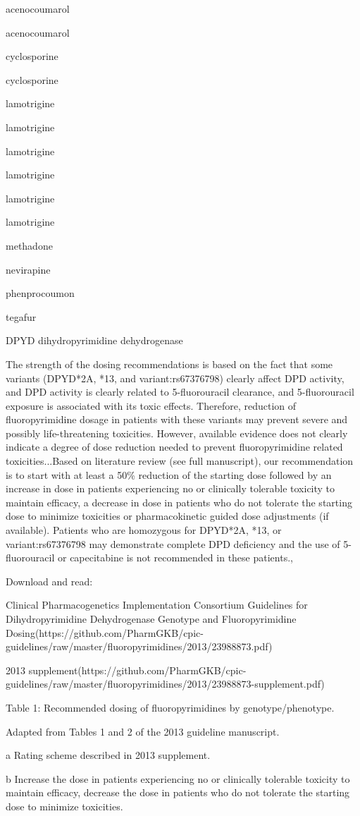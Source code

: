 \documentclass{resume} %
\begin{document}
\begin{rSection}{ acenocoumarol }
\begin{rSection}{ acenocoumarol }
\begin{rSection}{ cyclosporine }
\begin{rSection}{ cyclosporine }
\begin{rSection}{ lamotrigine }
\begin{rSection}{ lamotrigine }
\begin{rSection}{ lamotrigine }
\begin{rSection}{ lamotrigine }
\begin{rSection}{ lamotrigine }
\begin{rSection}{ lamotrigine }
\begin{rSection}{ methadone }
\begin{rSection}{ nevirapine }
\begin{rSection}{ phenprocoumon }
\begin{rSection}{ tegafur }
\begin{rSubsection}{ DPYD }{ dihydropyrimidine dehydrogenase }{}{}
\item The strength of the dosing recommendations is based on the fact that some variants (DPYD*2A, *13, and variant:rs67376798) clearly affect DPD activity, and DPD activity is clearly related to 5-fluorouracil clearance, and 5-fluorouracil exposure is associated with its toxic effects. Therefore, reduction of fluoropyrimidine dosage in patients with these variants may prevent severe and possibly life-threatening toxicities. However, available evidence does not clearly indicate a degree of dose reduction needed to prevent fluoropyrimidine related toxicities...Based on literature review (see full manuscript), our recommendation is to start with at least a 50\% reduction of the starting dose followed by an increase in dose in patients experiencing no or clinically tolerable toxicity to maintain efficacy, a decrease in dose in patients who do not tolerate the starting dose to minimize toxicities or pharmacokinetic guided dose adjustments (if available). Patients who are homozygous for DPYD*2A, *13, or variant:rs67376798 may demonstrate complete DPD deficiency and the use of 5-fluorouracil or capecitabine is not recommended in these patients.,  
 \newline
\item Download and read:
 \newline
\item Clinical Pharmacogenetics Implementation Consortium Guidelines for Dihydropyrimidine Dehydrogenase Genotype and Fluoropyrimidine Dosing(https://github.com/PharmGKB/cpic-guidelines/raw/master/fluoropyrimidines/2013/23988873.pdf)
 \newline
\item 2013 supplement(https://github.com/PharmGKB/cpic-guidelines/raw/master/fluoropyrimidines/2013/23988873-supplement.pdf)
 \newline
\item Table 1: Recommended dosing of fluoropyrimidines by genotype/phenotype.
 \newline
\item Adapted from Tables 1 and 2 of the 2013 guideline manuscript.
 \newline
\item a Rating scheme described in 2013 supplement.
 \newline
\item b Increase the dose in patients experiencing no or clinically tolerable toxicity to maintain efficacy,  decrease the dose in patients who do not tolerate the starting dose to minimize toxicities.

\end{rSubsection}
\end{rSection}
\end{rSection}
\end{rSection}
\end{rSection}
\end{rSection}
\end{rSection}
\end{rSection}
\end{rSection}
\end{rSection}
\end{rSection}
\end{rSection}
\end{rSection}
\end{rSection}
\end{rSection}
\end{document}
